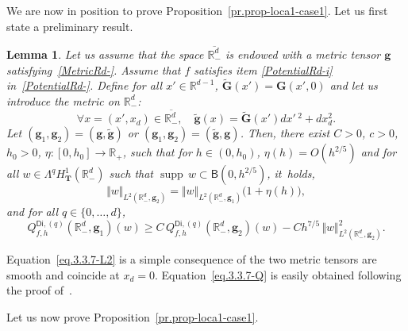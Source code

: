 \documentclass[JEP,XML,SOM,Unicode,NoEqCountersInSection,NoFloatCountersInSection,published]{cedram}
\newcommand{\mbf}[1]{\mathbf{#1}}
\DeclareMathOperator\supp{supp}
\theoremstyle{plain}
\newtheorem{lemma}[proposition]{Lemma}
\theoremstyle{definition}
\begin{document}
We are now in
position to prove Proposition~\ref{pr.prop-loca1-case1}.
Let us first state a preliminary result.
\begin{lemma}\label{le-3.3.7}
Let us assume that the space $\overline{\mathbb R^d_-}$ is endowed with a metric tensor $ \mbf{g}$ satisfying~\ref{MetricRd-}. Assume that $f$ satisfies item \eqref{PotentialRd-i} in~\ref{PotentialRd-}.
Define for all $x'\in \mathbb R^{d-1}$, $ \tilde{\mbf G}(x')= {\mbf
G}(x',0)$ and let us introduce the metric on $\mathbb R^d_-$:
\begin{equation}\label{eq.m-tilde}
\forall x=(x',x_d)\in \overline{\mathbb R^d_-}, \quad \tilde{\mbf g}(x)= \tilde{\mbf G}(x')dx'\,^2+dx_d^2.
\end{equation}
Let $ (\mbf g_1,\mbf g_2)=(\mbf g, \tilde{\mbf g})$ or $ (\mbf g_1,\mbf g_2)=(\tilde{\mbf g}, \mbf g)$.
Then, there exist $C>0$, $c>0$, $h_0>0$, $\eta:[0,h_0]\to\mathbb
R_+$, such that for $h\in (0,h_0)$, $\eta(h)=O(h^{2/5 })$ and for all $w\in \Lambda^q H^1_{\mbf T}(\mathbb R^d_-)$ such that $\supp\, w\subset \mathsf B(0,h^{2/5})$, it~holds,
\begin{equation}\label{eq.3.3.7-L2}
\Vert w \Vert_{L^2(\mathbb R^d_-, \mbf g_2)} = \Vert w \Vert_{L^2(\mathbb R^d_-, \mbf g_1)} \bigl(1+\eta(h)\bigr),
\end{equation}
and for all $q \in \{0, \ldots, d\}$,
\begin{equation}\label{eq.3.3.7-Q}
Q_{f,h}^{\mathsf{Di},(q)}(\mathbb R^d_-, \mbf g_1)(w)\ge C\, Q_{f,h}^{\mathsf{Di},(q)}(\mathbb R^d_-, \mbf g_2)(w)- Ch^{ 7/5}\, \Vert w \Vert_{L^2(\mathbb R^d_-, \mbf g_2)}^2.
\end{equation}
\end{lemma}
Equation~\eqref{eq.3.3.7-L2} is a simple consequence of the two metric
tensors are smooth and coincide at
$x_d=0$. Equation~\eqref{eq.3.3.7-Q} is easily obtained following the
proof of~\cite[Lem.\,3.3.7]{helffer-nier-06}.

Let us now prove Proposition~\ref{pr.prop-loca1-case1}.
\end{document}
